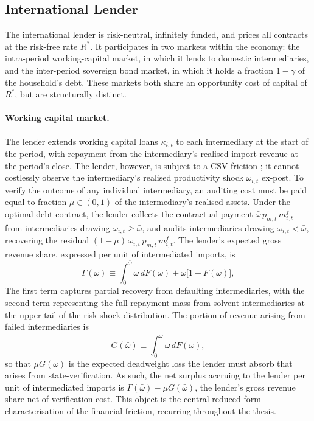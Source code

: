 \documentclass[11pt]{article}
\theoremstyle{definition}
\theoremstyle{plain}
\theoremstyle{remark}
\newcommand{\mf}{m^{f}}
\newcommand{\Rstar}{R^{*}}
\begin{document}

\subsection{International Lender} \label{sec:lender}

The international lender is risk-neutral, infinitely funded, and prices all contracts at the risk-free rate $\Rstar$. It participates in two markets within the economy: the intra-period working-capital market, in which it lends to domestic intermediaries, and the inter-period sovereign bond market, in which it holds a fraction $1-\gamma$ of the household's debt. These markets both share an opportunity cost of capital of $R^*$, but are structurally distinct.

\paragraph{Working capital market.} The lender extends working capital loans $\kappa_{i,t}$ to each intermediary at the start of the period, with repayment from the intermediary's realised import revenue at the period's close. The lender, however, is subject to a CSV friction \citep{townsend_optimal_1979, bernanke_chapter_1999}; it cannot costlessly observe the intermediary's realised productivity shock $\omega_{i,t}$ ex-post. To verify the outcome of any individual intermediary, an auditing cost must be paid equal to fraction $\mu \in (0,1)$ of the intermediary's realised assets.
Under the optimal debt contract, the lender collects the contractual payment $\bar{\omega}\,p_{m,t}\,\mf_{i,t}$ from intermediaries drawing $\omega_{i,t} \geq \bar{\omega}$, and audits intermediaries drawing $\omega_{i,t} < \bar{\omega}$, recovering the residual $(1-\mu)\,\omega_{i,t}\,p_{m,t}\,\mf_{i,t}$. The lender's expected gross revenue share, expressed per unit of intermediated imports, is
\begin{equation}\label{eq:Gammadef}
\Gamma(\bar{\omega}) \equiv \int_0^{\bar{\omega}} \omega \, dF(\omega) + \bar{\omega}\bigl[1 - F(\bar{\omega})\bigr],
\end{equation}
The first term captures partial recovery from defaulting intermediaries, with the second term representing the full repayment mass from solvent intermediaries at the upper tail of the risk-shock distribution. The portion of revenue arising from failed intermediaries is
\begin{equation}\label{eq:Gdef}
G(\bar{\omega}) \equiv \int_0^{\bar{\omega}} \omega \, dF(\omega),
\end{equation}
so that $\mu G(\bar{\omega})$ is the expected deadweight loss the lender must absorb that arises from state-verification. As such, the net surplus accruing to the lender per unit of intermediated imports is $\Gamma(\bar{\omega}) - \mu G(\bar{\omega})$, the lender's gross revenue share net of verification cost. This object is the central reduced-form characterisation of the financial friction, recurring throughout the thesis.
\end{document}

